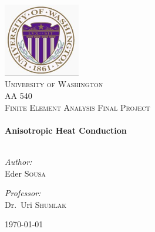 
\begin{titlepage}

\begin{center}


\includegraphics[width=0.25\textwidth]{ogo}\\[1cm]    

\textsc{\LARGE University of Washington}\\[1.5cm]

\textsc{\Large AA 540 \\ Finite Element Analysis Final Project}\\[0.5cm]


\HRule \\[0.4cm]
{ \huge \bfseries Anisotropic Heat Conduction}\\[0.4cm]

\HRule \\[1.5cm]

\begin{minipage}{0.4\textwidth}
\begin{flushleft} \large
\emph{Author:}\\
Eder \textsc{Sousa}
\end{flushleft}
\end{minipage}
\begin{minipage}{0.4\textwidth}
\begin{flushright} \large
\emph{Professor:} \\
Dr.~Uri \textsc{Shumlak}
\end{flushright}
\end{minipage}

\vfill

{\large \today}

\end{center}

\end{titlepage}